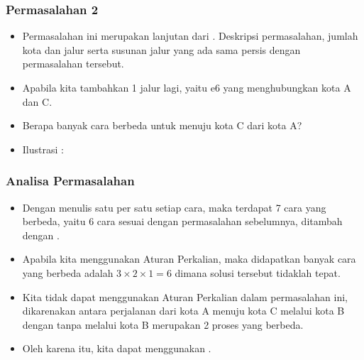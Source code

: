 \begin{frame}
\frametitle{Permasalahan 2}
\begin{itemize}
  \item Permasalahan ini merupakan lanjutan dari . Deskripsi permasalahan, jumlah kota dan jalur serta susunan jalur yang ada sama persis dengan permasalahan tersebut.
  \item Apabila kita tambahkan 1 jalur lagi, yaitu e6 yang menghubungkan kota A dan C.
  \item Berapa banyak cara berbeda untuk menuju kota C dari kota A?
  \item Ilustrasi :
  \newline
\end{itemize}
\end{frame}

\begin{frame}
\frametitle{Analisa Permasalahan}
\begin{itemize}
  \item Dengan menulis satu per satu setiap cara, maka terdapat 7 cara yang berbeda, yaitu 6 cara sesuai dengan permasalahan sebelumnya, ditambah dengan .
  \item Apabila kita menggunakan Aturan Perkalian, maka didapatkan banyak cara yang berbeda adalah $3 \times 2 \times 1 = 6$ dimana solusi tersebut tidaklah tepat.
  \item Kita tidak dapat menggunakan Aturan Perkalian dalam permasalahan ini, dikarenakan antara perjalanan dari kota A menuju kota C melalui kota B dengan tanpa melalui kota B merupakan 2 proses yang berbeda.
  \item Oleh karena itu, kita dapat menggunakan .
\end{itemize}
\end{frame}

